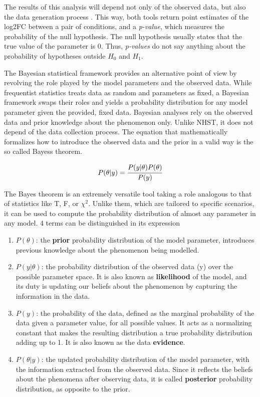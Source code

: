 The results of this analysis will depend not only of the observed data, but also the data generation process \cite{Kruschke}. This way, both tools return point estimates of the \ac{log2FC} between a pair of conditions, and a \textit{p-value}, which measures the probability of the null hypothesis. The null hypothesis usually states that the true value of the parameter is 0. Thus, \textit{p-values} do not say anything about the probability of hypotheses outside $H_0$ and $H_1$.

The Bayesian statistical framework provides an alternative point of view by revolving the role played by the model parameters and the observed data. While frequentist statistics treats data as random and parameters as fixed, a Bayesian framework swaps their roles and yields a probability distribution for any model parameter given the provided, fixed data. Bayesian analyses rely on the observed data and prior knowledge about the phenomenon only. Unlike \ac{NHST}, it does not depend of the data collection process. The equation that mathematically formalizes how to introduce the observed data and the prior in a valid way is the so called Bayes\textquotesingle s theorem.

\begin{equation}
P(\theta | y) = \cfrac{P(y | \theta) P(\theta)}{P(y)}
\end{equation}

The Bayes theorem is an extremely versatile tool taking a role analogous to that of statistics like T, F, or $\chi^2$. Unlike them, which are tailored to specific scenarios, it can be used to compute the probability distribution of almost any parameter in any model. 4 terms can be distinguished in its expression

\begin{enumerate}

\item $P(\theta)$: the \textbf{prior} probability distribution of the model parameter, introduces previous knowledge about the phenomenon being modelled.

\item $P(y | \theta)$: the probability distribution of the observed data (y) over the possible parameter space. It is also known as \textbf{likelihood} of the model, and its duty is updating our beliefs about the phenomenon by capturing the information in the data.

\item $P(y)$: the probability of the data, defined as the marginal probability of the data given a parameter value, for all possible values. It acts as a normalizing constant that makes the resulting distribution a true probability distribution adding up to 1. It is also known as the data \textbf{evidence}.

\item $P(\theta | y)$: the updated probability distribution of the model parameter, with the information extracted from the observed data. Since it reflects the beliefs about the phenomena after observing data, it is called \textbf{posterior} probability distribution, as opposite to the prior.

\end{enumerate}


